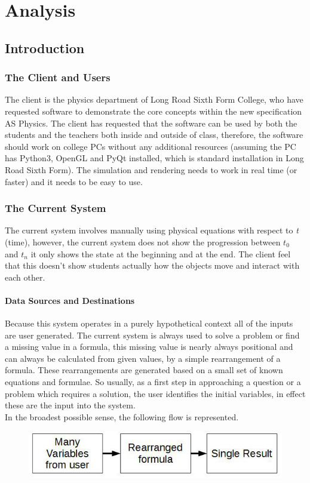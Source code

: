 \chapter{Analysis}

\section{Introduction}

\subsection{The Client and Users}
The client is the physics department of Long Road Sixth Form College, who have requested software to demonstrate the core concepts within the new specification AS Physics. The client has requested that the software can be used by both the students and the teachers both inside and outside of class, therefore, the software should work on college PCs without any additional resources (assuming the PC has Python3, OpenGL and PyQt installed, which is standard installation in Long Road Sixth Form). The simulation and rendering needs to work in real time (or faster) and it needs to be easy to use.

\subsection{The Current System}
The current system involves manually using physical equations with respect to \textit{t} (time), however, the current system does not show the progression between $t_0$ and $t_n$ it only shows the state at the beginning and at the end. The client feel that this doesn't show students actually how the objects move and interact with each other.

\subsubsection{Data Sources and Destinations}
	Because this system operates in a purely hypothetical context all of the inputs are user generated. The current system is always used to solve a problem or find a missing value in a formula, this missing value is nearly always positional and can always be calculated from given values, by a simple rearrangement of a formula. These rearrangements are generated based on a small set of known equations and formulae.
	So usually, as a first step in approaching a question or a problem which requires a solution, the user identifies the initial variables, in effect these are the input into the system.\\In the broadest possible sense, the following flow is represented.
\begin{figure}[H]
	\includegraphics[width=\textwidth]{./Analysis/current_system_data_flow.JPG}
\end{figure}

